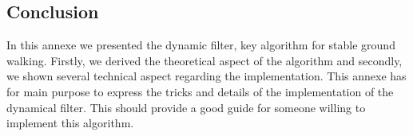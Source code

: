 \subsection{Conclusion}

In this annexe we presented the dynamic filter, key algorithm for stable ground walking.
Firstly, we derived the theoretical aspect of the algorithm and secondly, we shown several technical aspect regarding the implementation.
This annexe has for main purpose to express the tricks and details of the implementation of the dynamical filter.
This should provide a good guide for someone willing to implement this algorithm.
